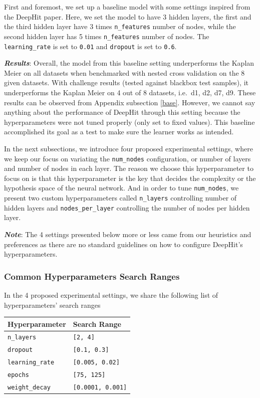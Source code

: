 \documentclass[
]{article}
\begin{document}
First and foremost, we set up a baseline model with some settings inspired from the DeepHit paper.
Here, we set the model to have 3 hidden layers, the first and the third hidden layer have 3 times \texttt{n\_features} number of nodes, while the second hidden layer has 5 times \texttt{n\_features} number of nodes. The \texttt{learning\_rate} is set to \texttt{0.01} and \texttt{dropout} is set to \texttt{0.6}.

\textbf{\emph{Results}}: Overall, the model from this baseline setting underperforms the Kaplan Meier on all datasets when benchmarked with nested cross validation on the 8 given datasets. With challenge results (tested against blackbox test samples), it underperforms the Kaplan Meier on 4 out of 8 datasets, i.e.~d1, d2, d7, d9. These results can be observed from Appendix subsection \ref{base}. However, we cannot say anything about the performance of DeepHit through this setting because the hyperparameters were not tuned properly (only set to fixed values). This baseline accomplished its goal as a test to make sure the learner works as intended.

In the next subsections, we introduce four proposed experimental settings, where we keep our focus on variating the \texttt{num\_nodes} configuration, or number of layers and number of nodes in each layer. The reason we choose this hyperparameter to focus on is that this hyperparameter is the key that decides the complexity or the hypothesis space of the neural network. And in order to tune \texttt{num\_nodes}, we present two custom hyperparameters called \texttt{n\_layers} controlling number of hidden layers and \texttt{nodes\_per\_layer} controlling the number of nodes per hidden layer.

\textbf{\emph{Note}}: The 4 settings presented below more or less came from our heuristics and preferences as there are no standard guidelines on how to configure DeepHit's hyperparameters.

\hypertarget{common-hyperparameters-search-ranges}{%
\subsubsection{Common Hyperparameters Search Ranges}\label{common-hyperparameters-search-ranges}}

In the 4 proposed experimental settings, we share the following list of hyperparameters' search ranges

\begin{longtable}[]{@{}ll@{}}
\toprule
\textbf{Hyperparameter} & \textbf{Search Range} \\
\midrule
\endhead
\texttt{n\_layers} & \texttt{{[}2,\ 4{]}} \\
\texttt{dropout} & \texttt{{[}0.1,\ 0.3{]}} \\
\texttt{learning\_rate} & \texttt{{[}0.005,\ 0.02{]}} \\
\texttt{epochs} & \texttt{{[}75,\ 125{]}} \\
\texttt{weight\_decay} & \texttt{{[}0.0001,\ 0.001{]}} \\
\bottomrule
\end{longtable}
\end{document}
